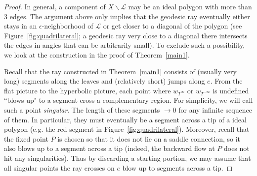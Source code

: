 \documentclass[11pt]{article} %
\theoremstyle{plain}
\theoremstyle{definition}
\numberwithin{equation}{section}
\begin{document}
\begin{proof}
In general, a component of $X\backslash\mathcal{L}$ may be an ideal polygon with more than $3$ edges. The argument above only implies that the geodesic ray eventually either stays in an $\epsilon$-neighborhood of $\mathcal{L}$ or get closer to a diagonal of the polygon (see Figure~\ref{fig:quadrilateral}; a geodesic ray very close to a diagonal there intersects the edges in angles that can be arbitrarily small). To exclude such a possibility, we look at the construction in the proof of Theorem~\ref{main1}.

Recall that the ray constructed in Theorem~\ref{main1} consists of (usually very long) segments along the leaves and (relatively short) jumps along $e$. From the flat picture to the hyperbolic picture, each point where $w_{T^\infty}$ or $w_{T^{-\infty}}$ is undefined ``blows up" to a segment cross a complementary region. For simplicity, we will call such a point \emph{singular}. The length of these segments $\to 0$ for any infinite sequence of them. In particular, they must eventually be a segment across a tip of a ideal polygon (e.g. the red segment in Figure~\ref{fig:quadrilateral}). Moreover, recall that the fixed point $P$ is chosen so that it does not lie on a saddle connection, so it also blows up to a segment across a tip (indeed, the backward flow at $P$ does not hit any singularities). Thus by discarding a starting portion, we may assume that all singular points the ray crosses on $e$ blow up to segments across a tip.


\end{proof}
\end{document}
